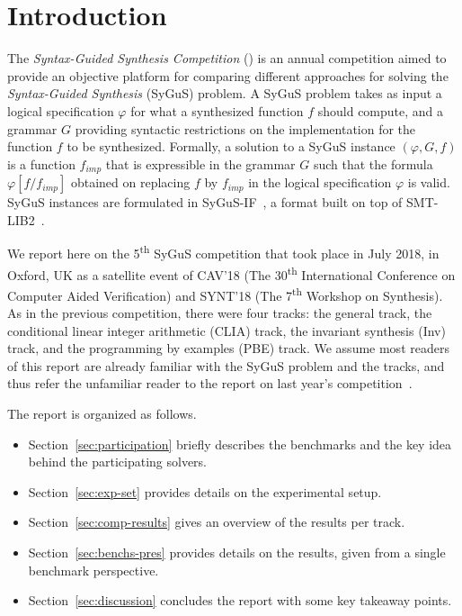 \section{Introduction}
\label{sec:intro}

The \emph{Syntax-Guided Synthesis Competition} (\comp) is an annual competition aimed to provide
an objective platform for comparing different approaches for solving the \emph{Syntax-Guided Synthesis} (SyGuS) problem.
A SyGuS problem takes as input a logical specification $\varphi$ for what a synthesized function $f$ should compute,
and a grammar $G$ providing syntactic restrictions on the implementation for the function $f$ to be synthesized.
Formally, a solution to a SyGuS instance $(\varphi,G,f)$ is a function $f_{imp}$ that is expressible in the grammar $G$
such that the formula $\varphi[f/f_{imp}]$ obtained on replacing $f$ by $f_{imp}$ in the logical specification $\varphi$ is valid.
SyGuS instances are formulated in SyGuS-IF~\cite{RaghothamanU14}, a format built on top of SMT-LIB2~\cite{smtlib}.

We report here on the 5\textsuperscript{th} SyGuS competition that took place in July 2018,
in Oxford, UK as a satellite event of CAV'18 (The 30\textsuperscript{th} International Conference on Computer Aided Verification)
and SYNT'18 (The 7\textsuperscript{th} Workshop on Synthesis).
As in the previous competition, there were four tracks:
the general track, the conditional linear integer arithmetic (CLIA) track, the invariant synthesis (Inv) track,
and the programming by examples (PBE) track.
We assume most readers of this report are already familiar with the SyGuS problem and the \comp{} tracks,
and thus refer the unfamiliar reader to the report on last year's competition~\cite{SyGuSComp17}.

The report is organized as follows.
\begin{itemize}[topsep=0.25em]
    \item Section~\ref{sec:participation} briefly describes the benchmarks and the key idea behind the participating solvers.
    \item Section~\ref{sec:exp-set} provides details on the experimental setup.
    \item Section~\ref{sec:comp-results} gives an overview of the results per track.
    \item Section~\ref{sec:benchs-pres} provides details on the results, given from a single benchmark perspective.
    \item Section~\ref{sec:discussion} concludes the report with some key takeaway points.
\end{itemize}
 